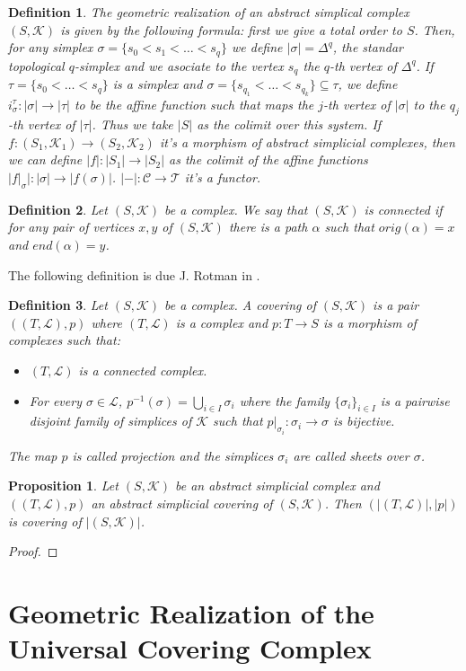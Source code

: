 \documentclass{amsart}
\newtheorem{proposition}{Proposition}[section]
\newtheorem{definition}{Definition}[section]
\begin{document}
\begin{definition}
The geometric realization of an abstract simplical complex $(S,\mathcal{K})$ is given by the following formula: first we give a total order to $S$. Then, for any simplex $\sigma=\{s_{0}<s_{1}<\ldots<s_{q}\}$ we define $|\sigma|=\Delta^{q}$, the standar topological $q$-simplex and we asociate to the vertex $s_{q}$ the $q$-th vertex of $\Delta^{q}$. If $\tau=\{s_{0}<\ldots<s_{q}\}$ is a simplex and $\sigma=\{s_{q_{1}}<\ldots<s_{q_{k}}\}\subseteq\tau$, we define $i_{\sigma}^{\tau}\colon|\sigma|\to|\tau|$ to be the affine function such that maps the $j$-th vertex of $|\sigma|$ to the $q_{j}$-th vertex of $|\tau|$. Thus we take $|S|$ as the colimit over this system. If $f\colon(S_{1},\mathcal{K}_{1})\to(S_{2},\mathcal{K}_{2})$ it's a morphism of abstract simplicial complexes, then we can define $|f|\colon|S_{1}|\to|S_{2}|$ as the colimit of the affine functions $|f|_{\sigma}|\colon|\sigma|\to|f(\sigma)|$. $|-|\colon\mathcal{C}\to\mathcal{T}$ it's a functor.
\end{definition}

\begin{definition}
Let $(S,\mathcal{K})$ be a complex. We say that $(S,\mathcal{K})$ is connected if for any pair of vertices $x,y$ of $(S,\mathcal{K})$ there is a path $\alpha$ such that $orig(\alpha)=x$ and $end(\alpha)=y$.
\end{definition}

The following definition is due J. Rotman in \cite{rotman1973covering}.

\begin{definition}
Let $(S,\mathcal{K})$ be a complex. A covering of $(S,\mathcal{K})$ is a pair $((T,\mathcal{L}),p)$ where $(T,\mathcal{L})$ is a complex and $p\colon T\longrightarrow S$ is a morphism of complexes such that:
\begin{itemize}
\item $(T,\mathcal{L})$ is a connected complex.
\item For every $\sigma\in\mathcal{L}$, $p^{-1}(\sigma)=\bigcup_{i\in I}\sigma_i$ where the family $\{\sigma_i\}_{i\in I}$ is a pairwise disjoint family of simplices of $\mathcal{K}$ such that $p|_{\sigma_i}\colon \sigma_i\longrightarrow \sigma$ is bijective.
\end{itemize}
The map $p$ is called projection and the simplices $\sigma_i$ are called sheets over $\sigma$.
\end{definition}

\begin{proposition}
Let $(S,\mathcal{K})$ be an abstract simplicial complex and $((T,\mathcal{L}),p)$ an abstract simplicial covering of $(S,\mathcal{K})$. Then $(\vert (T,\mathcal{L})\vert,\vert p\vert)$ is covering of $\vert (S,\mathcal{K})\vert$.
\end{proposition}

\begin{proof}

\end{proof}

\section{Geometric Realization of the Universal Covering Complex}





\end{document}
